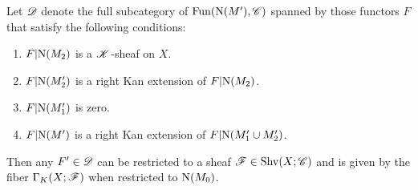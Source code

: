 \documentclass[../../thesis.tex]{subfiles}
\begin{document}
\begin{lemma}
    Let $\mathscr{D}$ denote the full subcategory of $\mathrm{Fun}(\mathrm{N}(M'), \mathscr{C})$ spanned by those functors $F$ that satisfy the following conditions:
    \begin{enumerate}
        \item $F|\mathrm{N}(M_2)$ is a $\mathscr{K}$-sheaf on $X$.
        \item $F|\mathrm{N}(M'_2)$ is a right Kan extension of $F|\mathrm{N}(M_2)$.
        \item $F|\mathrm{N}(M'_1)$ is zero.
        \item $F|\mathrm{N}(M')$ is a right Kan extension of $F|\mathrm{N}(M'_1 \cup M'_2)$.
    \end{enumerate}
    Then any $F'\in \mathscr{D}$ can be restricted to a sheaf $\mathscr{F} \in \mathrm{Shv}(X;\mathscr{C})$ and is given by the fiber $\Gamma_K(X;\mathscr{F})$ when restricted to $\mathrm{N}(M_0)$.
\end{lemma}
\end{document}
